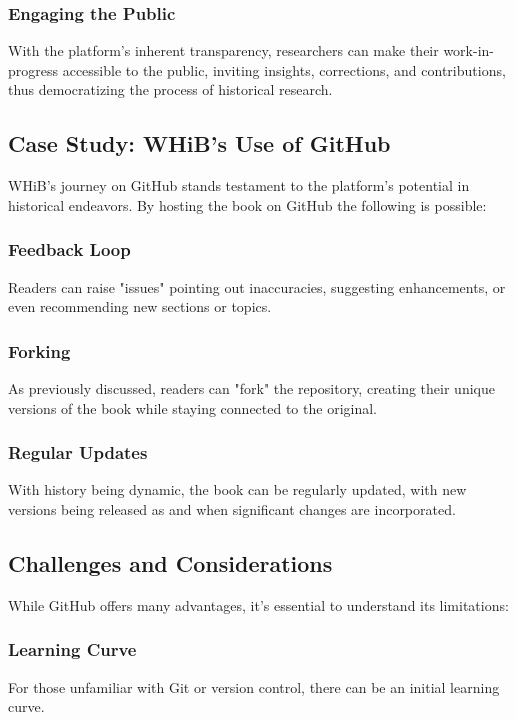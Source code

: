 \documentclass[a4paper,12pt]{book}
\begin{document}
\subsubsection*{Engaging the Public}
With the platform's inherent transparency, researchers can make their work-in-progress accessible to the public, inviting insights, corrections, and contributions, thus democratizing the process of historical research.

\subsection*{Case Study: WHiB's Use of GitHub}
WHiB's journey on GitHub stands testament to the platform's potential in historical endeavors. By hosting the book on GitHub the following is possible:

\subsubsection*{Feedback Loop}
Readers can raise "issues" pointing out inaccuracies, suggesting enhancements, or even recommending new sections or topics.

\subsubsection*{Forking}
As previously discussed, readers can "fork" the repository, creating their unique versions of the book while staying connected to the original.

\subsubsection*{Regular Updates}
With history being dynamic, the book can be regularly updated, with new versions being released as and when significant changes are incorporated.

\subsection*{Challenges and Considerations}
While GitHub offers many advantages, it's essential to understand its limitations:

\subsubsection*{Learning Curve}
For those unfamiliar with Git or version control, there can be an initial learning curve.
\end{document}
